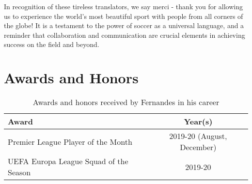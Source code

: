 \documentclass{article}
\begin{document}
In recognition of these tireless translators, we say merci - thank you for allowing us to experience the world's most beautiful sport with people from all corners of the globe! It is a testament to the power of soccer as a universal language, and a reminder that collaboration and communication are crucial elements in achieving success on the field and beyond.

\section*{Awards and Honors}
\begin{table}[h]
  \centering
  \begin{tabular}{|l|c|}
     \hline
     \textbf{Award} & \textbf{Year(s)} \\ \hline
     Premier League Player of the Month & 2019-20 (August, December) \\
     UEFA Europa League Squad of the Season & 2019-20 \\
     \hline
  \end{tabular}
  \caption*{Awards and honors received by Fernandes in his career}
\label{tab:awards_honors}
\end{table}
\end{document}
